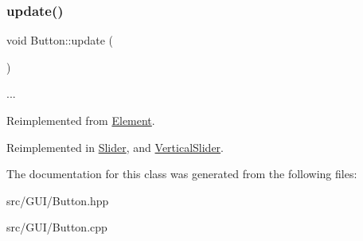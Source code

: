 \subsubsection{\texorpdfstring{update()}{update()}}
{\footnotesize\ttfamily void Button\+::update (\begin{DoxyParamCaption}{ }\end{DoxyParamCaption})\hspace{0.3cm}{\ttfamily [virtual]}}

... 

Reimplemented from \hyperlink{class_element_a35de04f6ab79440bb44083d8b300b87d}{Element}.



Reimplemented in \hyperlink{class_slider_a8bcc94829fa9c1546097da4e797665cb}{Slider}, and \hyperlink{class_vertical_slider_ae868b87e37fbdac6e4906ac6b9ad465d}{Vertical\+Slider}.



The documentation for this class was generated from the following files\+:\begin{DoxyCompactItemize}
\item 
src/\+G\+U\+I/Button.\+hpp\item 
src/\+G\+U\+I/Button.\+cpp\end{DoxyCompactItemize}
